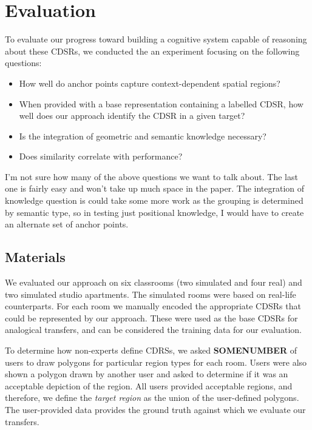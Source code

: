 \section{Evaluation}\label{sec:evaluation}

To evaluate our progress toward building a cognitive system capable of reasoning about these CDSRs, we conducted the an experiment focusing on the following questions:
\begin{itemize}
\item{How well do anchor points capture context-dependent spatial regions?}
\item{When provided with a base representation containing a labelled CDSR, how well does our approach identify the CDSR in a given target?}
\item{Is the integration of geometric and semantic knowledge necessary?}
\item{Does similarity correlate with performance?}
\end{itemize}

I'm not sure how many of the above questions we want to talk about. The last one is fairly easy and won't take up much space in the paper. The integration of knowledge question is could take some more work as the grouping is determined by semantic type, so in testing just positional knowledge,  I would have to create an alternate set of anchor points.

\subsection{Materials}


We evaluated our approach on six classrooms (two simulated and four real) and two simulated studio apartments. The simulated rooms were based on real-life counterparts. For each room we manually encoded the appropriate CDSRs that could be represented by our approach. These were used as the base CDSRs for analogical transfers, and can be considered the training data for our evaluation. 

To determine how non-experts define CDRSs, we asked \textbf{SOMENUMBER} of users to draw polygons for particular region types for each room. Users were also shown a polygon drawn by another user and asked to determine if it was an acceptable depiction of the region. All users provided acceptable regions, and therefore, we define the \textit{target region} as the union of the user-defined polygons. The user-provided data provides the ground truth against which we evaluate our transfers.

